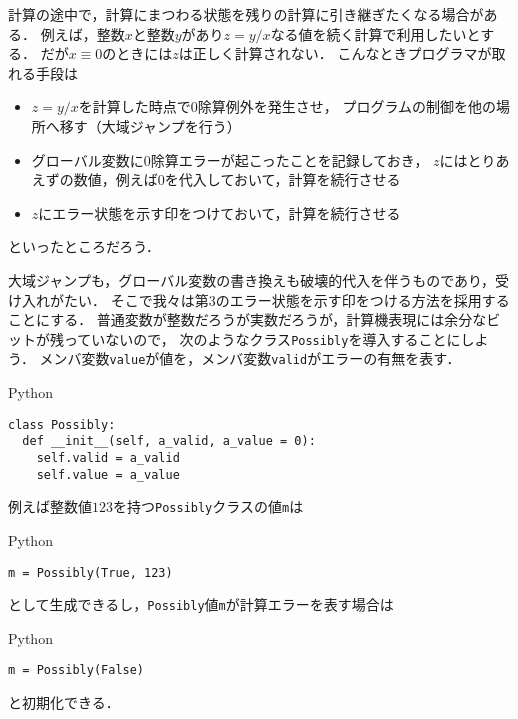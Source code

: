 \documentclass[a5paper,draft]{jsbook}
\newcommand{\programminglanguage}[1]{\textsf{#1}}
\newcommand{\python}{\programminglanguage{Python}}
\newcommand{\code}[1]{\texttt{#1}}
\newenvironment{pythoncode}{\begin{itembox}[r]{\python}}{\end{itembox}}
\newcommand{\pthnClassname}[1]{{DO NOT USE}--\textrm{#1}}
\newcommand{\pthnKeyword}[1]{{DO NOT USE}--\textbf{#1}}
\newcommand{\pthnOp}[1]{{DO NOT USE}--\texttt{#1}}
\begin{document}
計算の途中で，計算にまつわる状態を残りの計算に引き継ぎたくなる場合がある．
例えば，整数$x$と整数$y$があり$z=y/x$なる値を続く計算で利用したいとする．
だが$x\equiv0$のときには$z$は正しく計算されない．
こんなときプログラマが取れる手段は
\begin{itemize}
\item $z=y/x$を計算した時点で$0$除算例外を発生させ，
プログラムの制御を他の場所へ移す（大域ジャンプを行う）
\item グローバル変数に$0$除算エラーが起こったことを記録しておき，
$z$にはとりあえずの数値，例えば$0$を代入しておいて，計算を続行させる
\item $z$にエラー状態を示す印をつけておいて，計算を続行させる
\end{itemize}
といったところだろう．

大域ジャンプも，グローバル変数の書き換えも破壊的代入を伴うものであり，受け入れがたい．
そこで我々は第3のエラー状態を示す印をつける方法を採用することにする．
普通変数が整数だろうが実数だろうが，計算機表現には余分なビットが残っていないので，
次のようなクラス\code{Possibly}を導入することにしよう．
メンバ変数\code{value}が値を，メンバ変数\code{valid}がエラーの有無を表す．
\begin{pythoncode}
\begin{verbatim}
class Possibly:
  def __init__(self, a_valid, a_value = 0):
    self.valid = a_valid
    self.value = a_value
\end{verbatim}
\end{pythoncode}

例えば整数値$123$を持つ\code{Possibly}クラスの値\code{m}は
\begin{pythoncode}
\begin{verbatim}
m = Possibly(True, 123)
\end{verbatim}
\end{pythoncode}
として生成できるし，\code{Possibly}値\code{m}が計算エラーを表す場合は
\begin{pythoncode}
\begin{verbatim}
m = Possibly(False)
\end{verbatim}
\end{pythoncode}
と初期化できる．
\end{document}
